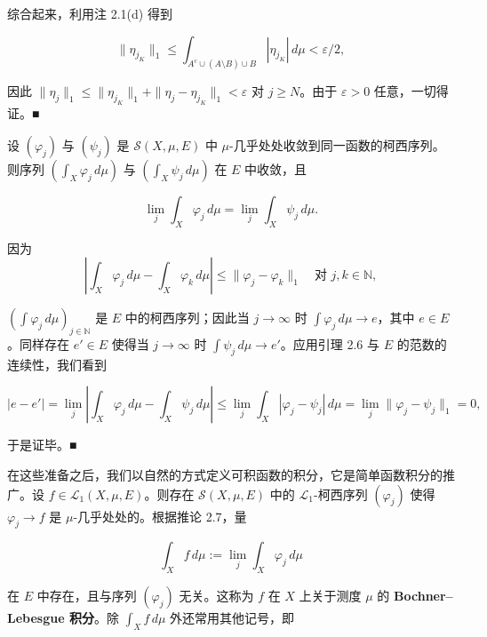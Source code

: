 \begin{lemma}
\begin{subitems}
综合起来，利用注 2.1(d) 得到

\[
\|\eta_{j_K}\|_1 \le \int_{A^{c} \cup (A \setminus B) \cup B} |\eta_{j_K}| \, d\mu < \varepsilon/2 ,
\]

因此 $ \|\eta_j\|_1 \le \|\eta_{j_K}\|_1 + \|\eta_j - \eta_{j_K}\|_1 < \varepsilon $ 对 $ j \ge N $。由于 $ \varepsilon > 0 $ 任意，一切得证。\nobreak\hspace{0.35em}■

\end{subitems}

\end{lemma}

\begin{corollary}

设 $ (\varphi_j) $ 与 $ (\psi_j) $ 是 $ \mathcal{S}(X,\mu,E) $ 中 $ \mu $-几乎处处收敛到同一函数的柯西序列。则序列 $ \left( \int_X \varphi_j \, d\mu \right) $ 与 $ \left( \int_X \psi_j \, d\mu \right) $ 在 $ E $ 中收敛，且

\[
\lim_j \int_X \varphi_j \, d\mu = \lim_j \int_X \psi_j \, d\mu .
\]

\proofhead
因为
\[
\left| \int_X \varphi_j \, d\mu - \int_X \varphi_k \, d\mu \right| \le \|\varphi_j - \varphi_k\|_1 \quad \text{对 } j, k \in \mathbb{N} ,
\]

$ \left( \int \varphi_j \, d\mu \right)_{j \in \mathbb{N}} $ 是 $ E $ 中的柯西序列；因此当 $ j \to \infty $ 时 $ \int \varphi_j \, d\mu \to e $，其中 $ e \in E $。同样存在 $ e' \in E $ 使得当 $ j \to \infty $ 时 $ \int \psi_j \, d\mu \to e' $。应用引理 2.6 与 $ E $ 的范数的连续性，我们看到

\[
|e - e'| = \lim_j \left| \int_X \varphi_j \, d\mu - \int_X \psi_j \, d\mu \right| \le \lim_j \int_X |\varphi_j - \psi_j| \, d\mu = \lim_j \|\varphi_j - \psi_j\|_1 = 0 ,
\]

于是证毕。\nobreak\hspace{0.35em}■

\end{corollary}

在这些准备之后，我们以自然的方式定义可积函数的积分，它是简单函数积分的推广。设 $ f \in \mathcal{L}_1(X,\mu,E) $。则存在 $ \mathcal{S}(X,\mu,E) $ 中的 $ \mathcal{L}_1 $-柯西序列 $ (\varphi_j) $ 使得 $ \varphi_j \to f $ 是 $ \mu $-几乎处处的。根据推论 2.7，量

\[
\int_X f \, d\mu := \lim_j \int_X \varphi_j \, d\mu
\]

在 $ E $ 中存在，且与序列 $ (\varphi_j) $ 无关。这称为 $ f $ 在 $ X $ 上关于测度 $ \mu $ 的 \textbf{Bochner–Lebesgue 积分}。除 $ \int_X f \, d\mu $ 外还常用其他记号，即

